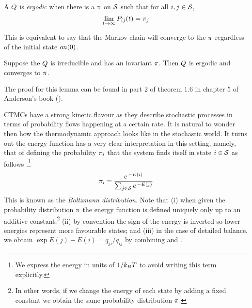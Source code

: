 \begin{definition}[ergodicity]
  A \qmatrix $Q$ is \emph{ergodic} when
  there is a \pmf $\pi$ on $\mathcal{S}$ such that
  for all $i,j \in \mathcal{S}$,
  \[ \lim_{t \to \infty} P_{ij}(t) = \pi_j \]
\end{definition}

This is equivalent to say that the Markov chain
will converge to the \pmf $\pi$
regardless of the initial state $on(0)$.

\begin{lemma}
  \label{lemma:ergodic}
  Suppose the \qmatrix $Q$ is irreducible
  and has an invariant \pmf $\pi$.
  Then $Q$ is ergodic and converges to $\pi$.
\end{lemma}

The proof for this lemma can be found in part 2 of theorem 1.6
in chapter 5 of Anderson's book (\cite*[][pages 160--161]{anderson}).

CTMCs have a strong kinetic flavour as they describe
stochastic processes in terms of probability flows
happening at a certain rate. %
%
It is natural to wonder then how the thermodynamic approach
looks like in the stochastic world.
It turns out the energy function has a very clear interpretation
in this setting, namely, that of defining the probability $\pi_i$
that the system finds itself in state $i \in \mathcal{S}$ as follows
\citep[page 40]{mcquarrie-stat-mech}.\footnote{
  We express the energy in units of $1/k_B T$
  to avoid writing this term explicitly.}
\begin{equation}
  \label{eq:energy}
  \pi_i = \frac{e^{\,-E(i)}}{\sum_{j \in \mathcal{S}} e^{\,-E(j)}}
\end{equation}
This is known as the \emph{Boltzmann distribution}.
Note that
(i) when given the probability distribution $\pi$
the energy function is defined uniquely
only up to an additive constant;\footnote{
  In other words, if we change the energy of each state by adding
  a fixed constant we obtain the same probability distribution $\pi$.}
(ii) by convention the sign of the energy is inverted
so lower energies represent more favourable states; and
(iii) in the case of detailed balance,
we obtain $\exp{E(j)-E(i)} = q_{ji}/q_{ij}$
by combining  and .

